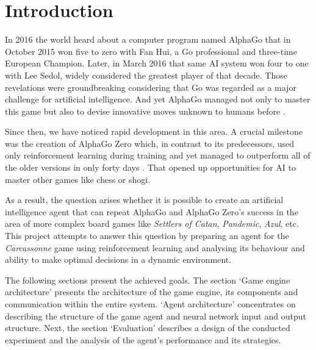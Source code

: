 \section{Introduction}
\label{chap:introduction}

In 2016 the world heard about a computer program named AlphaGo that in October 2015
won five to zero with Fan Hui, a Go professional and three-time European Champion. Later,
in March 2016 that same AI system won four to one with Lee Sedol, widely considered the
greatest player of that decade. Those revelations were groundbreaking considering that Go
was regarded as a major challenge for artificial intelligence. And yet AlphaGo managed not
only to master this game but also to devise innovative moves unknown to humans before \cite{AlphaGoBlog}.

Since then, we have noticed rapid development in this area. A crucial milestone was
the creation of AlphaGo Zero which, in contrast to its predecessors, used only reinforcement
learning during training and yet managed to outperform all of the older versions in only forty
days \cite{AlphaGoZeroBlog}. That opened up opportunities for AI to master other games like chess 
or shogi.

As a result, the question arises whether it is possible to create an artificial intelligence
agent that can repeat AlphaGo and AlphaGo Zero's success in the area of more complex
board games like \textit{Settlers of Catan}, \textit{Pandemic}, \textit{Azul}, etc. This 
project attempts to answer this question by preparing an agent for the \textit{Carcassonne} game 
using reinforcement learning and analysing its behaviour and ability to make optimal 
decisions in a dynamic environment.

The following sections present the achieved goals. The section `Game engine architecture' 
presents the architecture of the game engine, its components and communication within the entire system. `Agent architecture' 
concentrates on describing the structure of the game agent and neural network input and
output structure. Next, the section `Evaluation' describes a design of the conducted experiment 
and the analysis of the agent's performance and its strategies.

